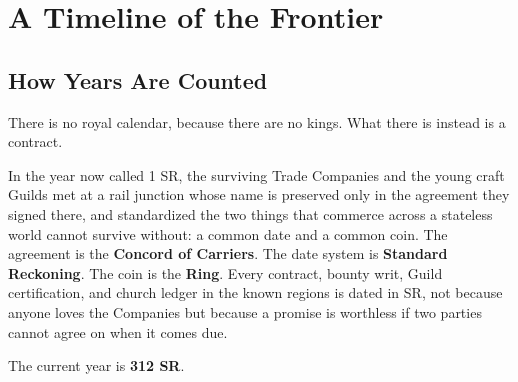 
\section{A Timeline of the Frontier}

\subsection{How Years Are Counted}

There is no royal calendar, because there are no kings. What there is instead is a contract.

In the year now called 1 SR, the surviving Trade Companies and the young craft Guilds met at a rail junction whose name is preserved only in the agreement they signed there, and standardized the two things that commerce across a stateless world cannot survive without: a common date and a common coin. The agreement is the \textbf{Concord of Carriers}. The date system is \textbf{Standard Reckoning}. The coin is the \textbf{Ring}. Every contract, bounty writ, Guild certification, and church ledger in the known regions is dated in SR, not because anyone loves the Companies but because a promise is worthless if two parties cannot agree on when it comes due.

The current year is \textbf{312 SR}.

